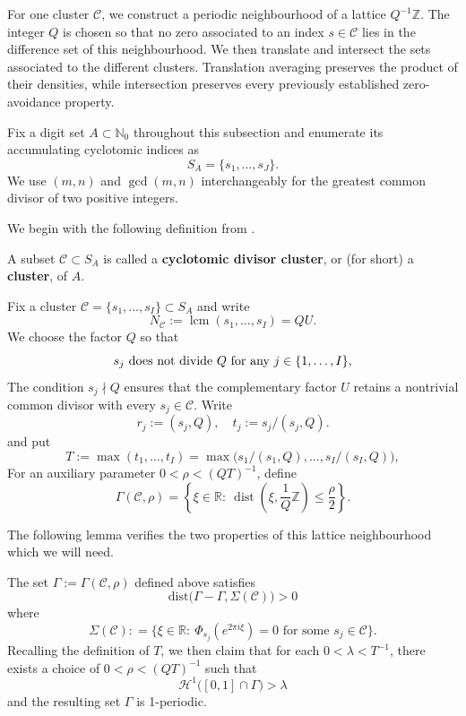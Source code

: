 \documentclass[12pt]{amsart}
\numberwithin{equation}{section}
\DeclareMathOperator{\dist}{dist}
\newcommand{\RR}{\mathbb R}
\begin{document}
For one cluster $\mathcal C$, we construct a periodic neighbourhood of a lattice $Q^{-1}\mathbb Z$.  The integer $Q$ is chosen so that no zero associated to an index $s\in\mathcal C$ lies in the difference set of this neighbourhood.  We then translate and intersect the sets associated to the different clusters.  Translation averaging preserves the product of their densities, while intersection preserves every previously established zero-avoidance property.

Fix a digit set $A\subset\mathbb N_0$ throughout this subsection and enumerate its accumulating cyclotomic indices as
\[
 S_A=\{s_1,\ldots,s_J\}.
\]
We use $(m,n)$ and $\gcd(m,n)$ interchangeably for the greatest common divisor of two positive integers.

We begin with the following definition from \cite{LM}.

\medskip

\begin{definition}
A subset $\mathcal{C} \subset S_A$ is called a \textbf{cyclotomic divisor cluster}, or (for short) a \textbf{cluster}, of $A$.
\end{definition}

Fix a cluster $\mathcal C=\{s_1,\ldots,s_I\}\subset S_A$ and write
\[
 N_{\mathcal C}:=\operatorname{lcm}(s_1,\ldots,s_I)=QU.
\]
We choose the factor $Q$ so that
\begin{equation}\label{q-e1}
s_j \hbox{ does not divide } Q \hbox{ for any } j\in \{1,\dots,I\},
\end{equation}
The condition $s_j\nmid Q$ ensures that the complementary factor $U$ retains a nontrivial common divisor with every $s_j\in\mathcal C$.  Write
$$
r_j:=(s_j,Q), \quad t_j:= s_j/(s_j,Q).
$$
and put
$$
T := \max(t_1,\dots,t_I)  = \max \big(s_1/(s_1,Q),...,s_I/(s_I,Q)\big),
$$
For an auxiliary parameter $0<\rho<(QT)^{-1}$, define
\begin{equation}\label{eq:singlegammadefn}
\Gamma (\mathcal{C},\rho) =\left\{\xi\in \RR :\ \dist(\xi,\frac{1}{Q}\mathbb{Z})\leq\frac{\rho}{2}\right\}.
\end{equation}

The following lemma verifies the two properties of this lattice neighbourhood which we will need.

\medskip

\begin{lemma}\label{q-lemma1}\label{q-lemma2}
The set $\Gamma := \Gamma (\mathcal{C},\rho)$ defined above satisfies
$$
\text{dist} \big( \Gamma -  \Gamma, \Sigma(\mathcal{C}) \big) > 0
$$
where
\begin{equation}\label{q-cluster-sigma}
\Sigma(\mathcal{C}) : =  \{\xi \in \RR: \ \Phi_{s_j} (e^{2\pi i\xi})=0 \textrm{ for some } s_j\in \mathcal{C} \}.
\end{equation}
Recalling the definition of $T$, we then claim that for each $0<\lambda<T^{-1}$, there exists a choice of $0<\rho<(QT)^{-1}$ such that
\begin{equation}\label{e-lambda}
\mathcal{H}^1 \big( [0,1] \cap \Gamma  \big) > \lambda
\end{equation}
and the resulting set $\Gamma$ is 1-periodic.
\end{lemma}
\end{document}

